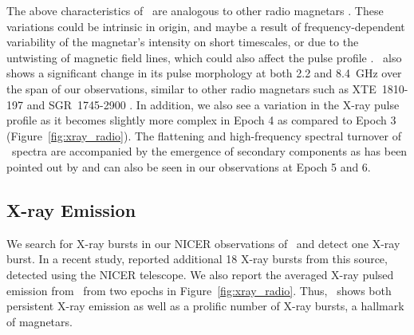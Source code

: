 \documentclass[twocolumn]{emulateapj}
\begin{document}
The above characteristics of \jmag\ are analogous to other radio magnetars 
\citep{lazaridis2008, torne2015}. These variations could be intrinsic in origin, 
and maybe a result of frequency-dependent variability of the magnetar's intensity 
on short timescales, or due to the untwisting of magnetic field lines, which could 
also affect the pulse profile \citep{scholz17}. \jmag\ also shows a significant 
change in its pulse morphology at both 2.2 and 8.4~GHz over the span of our 
observations, similar to other radio magnetars such as XTE~1810-197 and SGR~1745-2900 
\citep{camilo2007, pearlman2018}. In addition, we also see a variation in the X-ray 
pulse profile as it becomes slightly more complex in Epoch 4 as compared to Epoch 3 
(Figure~\ref{fig:xray_radio}). The flattening and high-frequency spectral turnover 
of \jmag\ spectra are 
accompanied by the emergence of secondary components as has been pointed out by 
\cite{lower2021} and can also be seen in our observations at Epoch 5 and 6. 


\subsection{X-ray Emission}
\label{ssec:xray_em}
We search for X-ray bursts in our NICER observations of \jmag\ and detect one X-ray 
burst. In a recent study, \cite{hu2020} reported additional 18 X-ray bursts from 
this source, detected using the NICER telescope. We also report the averaged X-ray 
pulsed emission from \jmag\ from two epochs in Figure~\ref{fig:xray_radio}. Thus, 
\jmag\ shows both persistent X-ray emission as well as a prolific number of X-ray bursts, 
a hallmark of magnetars.
\end{document}
